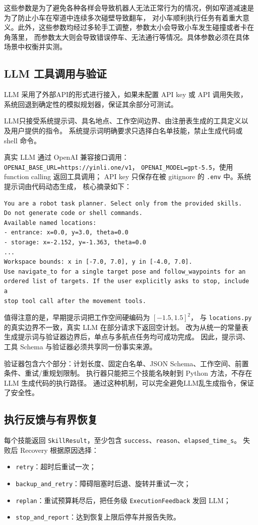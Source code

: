 \documentclass[10pt,twocolumn]{ctexart}
\begin{document}
这些参数是为了避免各种各样会导致机器人无法正常行为的情况，例如窄道减速是为了防止小车在窄道中连续多次碰壁导致翻车，
对小车顺利执行任务有着重大意义。此外，这些参数均经过多轮手工调整，参数太小会导致小车发生碰撞或者卡在角落里，
而参数太大则会导致错误停车、无法通行等情况。具体参数必须在具体场景中权衡并实测。

\subsection{LLM 工具调用与验证}
LLM 采用了外部API的形式进行接入，如果未配置 API key 或 API 调用失败，系统回退到确定性的模拟规划器，保证其余部分可测试。

LLM只接受系统提示词、具名地点、工作空间边界、由注册表生成的工具定义以及用户提供的指令。
系统提示词明确要求只选择白名单技能，禁止生成代码或 shell 命令。

真实 LLM 通过 OpenAI 兼容接口调用：
\texttt{OPENAI\_BASE\_URL=https://yinli.one/v1}，
\texttt{OPENAI\_MODEL=gpt-5.5}，使用 function calling 返回工具调用；
API key 只保存在被 gitignore 的 \texttt{.env} 中。系统提示词由代码动态生成，
核心摘录如下：
\begin{lstlisting}
You are a robot task planner. Select only from the provided skills.
Do not generate code or shell commands.
Available named locations:
- entrance: x=0.0, y=3.0, theta=0.0
- storage: x=-2.152, y=-1.363, theta=0.0
...
Workspace bounds: x in [-7.0, 7.0], y in [-4.0, 7.0].
Use navigate_to for a single target pose and follow_waypoints for an
ordered list of targets. If the user explicitly asks to stop, include a
stop tool call after the movement tools.
\end{lstlisting}

值得注意的是，早期提示词把工作空间硬编码为 $[-1.5,1.5]^2$，
与 \texttt{locations.py} 的真实边界不一致，真实 LLM 在部分请求下返回空计划。
改为从统一的常量表生成提示词与验证器边界后，单点与多航点任务均可成功完成。
因此，提示词、工具 Schema 与验证器必须共享同一份事实来源。

验证器包含六个部分：计划长度、固定白名单、JSON Schema、工作空间、前置条件、重试/重规划限制。
执行器只能把三个技能名映射到 Python 方法，不存在 LLM 生成代码的执行路径。
通过这种机制，可以完全避免LLM乱生成指令，保证了安全性。

\subsection{执行反馈与有界恢复}
每个技能返回 \texttt{SkillResult}，至少包含 \texttt{success}、\texttt{reason}、\texttt{elapsed\_time\_s}。
失败后 Recovery 根据原因选择：
\begin{itemize}
  \item \texttt{retry}：超时后重试一次；
  \item \texttt{backup\_and\_retry}：障碍阻塞时后退、旋转并重试一次；
  \item \texttt{replan}：重试预算耗尽后，把任务级 \texttt{ExecutionFeedback} 发回 LLM；
  \item \texttt{stop\_and\_report}：达到恢复上限后停车并报告失败。
\end{itemize}
\end{document}
